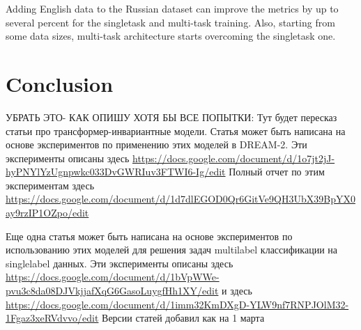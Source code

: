 Adding English data to the Russian dataset can improve the metrics by up to several percent for the singletask and multi-task training. Also, starting from some data sizes, multi-task architecture starts overcoming the singletask one.


\section{Conclusion}


УБРАТЬ ЭТО- КАК ОПИШУ ХОТЯ БЫ ВСЕ ПОПЫТКИ:
Тут будет пересказ статьи про трансформер-инвариантные модели. 
Статья может быть написана на основе экспериментов по применению этих моделей в DREAM-2. Эти эксперименты описаны здесь \url{https://docs.google.com/document/d/1o7jt2jJ-hyPNYlYzUgnpwkc033DvGWRIuv3FTWI6-Ig/edit}
Полный отчет по этим экспериментам здесь \url{https://docs.google.com/document/d/1d7dlEGOD0Qr6GitVe9QH3UbX39BpYX0ay9rzIP1OZpo/edit}

Еще одна статья может быть написана на основе экспериментов по использованию этих моделей для решения задач multilabel классификации на singlelabel данных. Эти эксперименты описаны здесь
\url{https://docs.google.com/document/d/1bVpWWe-pvu3c8da08DJVkjjafXqG6GasoLuygfHh1XY/edit}
и здесь 
\url{https://docs.google.com/document/d/1imm32KmDXgD-YLW9nf7RNPJOlM32-1Fgaz3xeRVdvvo/edit}
Версии статей добавил как на 1 марта
